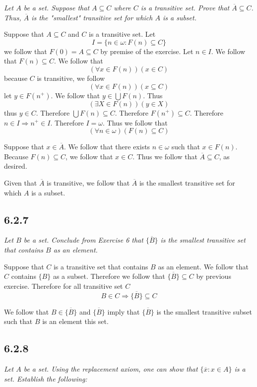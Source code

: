 \documentclass[11pt,oneside,titlepage]{book}
\DeclareMathOperator \ra {\Rightarrow}
\begin{document}
\textit{Let $A$ be a set. Suppose that $A \subseteq C$ where $C$ is a transitive set.
  Prove that $\overline{A} \subseteq C$. Thus, $\overline{A}$ is the "smallest"
  transitive set for which $A$ is a subset.}

Suppose that $A \subseteq C$ and $C$ is a transitive set.
Let
$$I = \{n \in \omega: F(n) \subseteq C\}$$
we follow that $F(0) = A \subseteq C$ by premise of the exercise. Let $n \in I$.
We follow that $F(n) \subseteq C$. We follow that
$$(\forall x \in F(n))(x \in C)$$
because $C$ is transitive, we follow
$$(\forall x \in F(n))(x \subseteq C)$$
let $y \in F(n^+)$. We follow that $y \in \bigcup{F(n)}$. Thus
$$(\exists X \in F(n))(y \in X)$$
thus $y \in C$. Therefore $\bigcup{F(n)} \subseteq C$. Therefore $F(n^+) \subseteq C$.
Therefore $n \in I \ra n^+ \in I$. Therefore $I = \omega$. Thus we follow that
$$(\forall n \in \omega)(F(n) \subseteq C)$$

Suppose that $x \in \overline{A}$. We follow that there exists $n \in \omega$ such that
$x \in F(n)$. Because $F(n) \subseteq C$, we follow that $x \in C$. Thus we follow that
$\overline{A} \subseteq C$, as desired.

Given that $\overline{A}$ is transitive, we follow that $\overline{A}$ is the smallest
transitive set for which $A$ is a subset.

\subsection*{6.2.7}

\textit{Let $B$ be a set. Conclude from Exercise 6 that $\overline{\{B\}}$ is the
  smallest transitive set that contains $B$ as an element.}

Suppose that $C$ is a transitive set that contains $B$ as an element. We follow that
$C$ contains $\{B\}$ as a subset. Therefore we follow that $\overline{\{B\}} \subseteq C$
by previous exercise. Therefore for all
transitive set $C$
$$B \in C \ra \overline{\{B\}} \subseteq C$$

We follow that  $B \in \overline{\{B\}}$ and $\overline{\{B\}}$ imply that
$\overline{\{B\}}$ is the smallest transitive subset such that $B$ is an element this set.

\subsection*{6.2.8}

\textit{Let $A$ be a set. Using the replacement axiom, one can show that
  $\{\overline{x}: x \in A\}$ is a set. Establish the following:}
\end{document}
